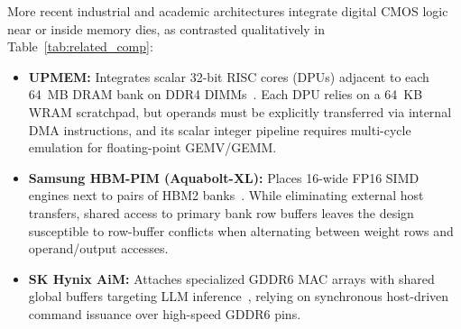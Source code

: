 \documentclass[conference]{IEEEtran}
\begin{document}
More recent industrial and academic architectures integrate digital CMOS logic near or inside memory dies, as contrasted qualitatively in Table~\ref{tab:related_comp}:
\begin{itemize}
    \item \textbf{UPMEM:} Integrates scalar 32-bit RISC cores (DPUs) adjacent to each 64~MB DRAM bank on DDR4 DIMMs~\cite{devaux2019true}. Each DPU relies on a 64~KB WRAM scratchpad, but operands must be explicitly transferred via internal DMA instructions, and its scalar integer pipeline requires multi-cycle emulation for floating-point GEMV/GEMM.
    \item \textbf{Samsung HBM-PIM (Aquabolt-XL):} Places 16-wide FP16 SIMD engines next to pairs of HBM2 banks~\cite{lee2021hardware}. While eliminating external host transfers, shared access to primary bank row buffers leaves the design susceptible to row-buffer conflicts when alternating between weight rows and operand/output accesses.
    \item \textbf{SK Hynix AiM:} Attaches specialized GDDR6 MAC arrays with shared global buffers targeting LLM inference~\cite{lee2022aim}, relying on synchronous host-driven command issuance over high-speed GDDR6 pins.
\end{itemize}

\begin{table}[t]
\centering
\caption{Architectural Comparison with Representative PIM Designs}
\label{tab:related_comp}
\footnotesize
\setlength{\tabcolsep}{3.5pt}
\end{table}
\end{document}
